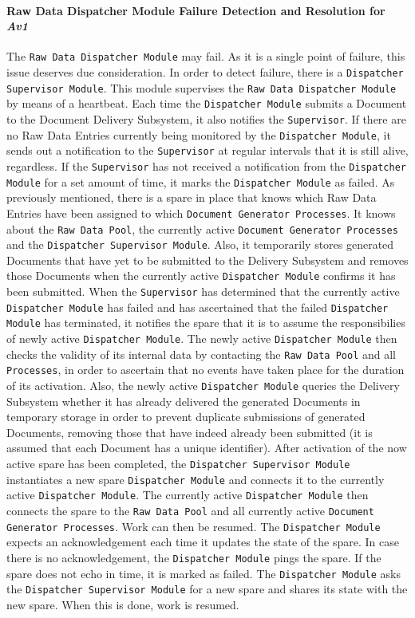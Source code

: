 \documentclass[a4paper,10pt]{article}
\begin{document}
\paragraph{Raw Data Dispatcher Module Failure Detection and Resolution for \emph{Av1}}
The \texttt{Raw Data Dispatcher Module} may fail. As it is a single point of failure, this issue deserves due consideration. In order to detect failure, there is a \texttt{Dispatcher Supervisor Module}. This module supervises the \texttt{Raw Data Dispatcher Module} by means of a heartbeat. Each time the \texttt{Dispatcher Module} submits a Document to the Document Delivery Subsystem, it also notifies the \texttt{Supervisor}. If there are no Raw Data Entries currently being monitored by the \texttt{Dispatcher Module}, it sends out a notification to the \texttt{Supervisor} at regular intervals that it is still alive, regardless. If the \texttt{Supervisor} has not received a notification from the \texttt{Dispatcher Module} for a set amount of time, it marks the \texttt{Dispatcher Module} as failed. 
As previously mentioned, there is a spare in place that knows which Raw Data Entries have been assigned to which \texttt{Document Generator Processes}. It knows about the \texttt{Raw Data Pool}, the currently active \texttt{Document Generator Processes} and the \texttt{Dispatcher Supervisor Module}. Also, it temporarily stores generated Documents that have yet to be submitted to the Delivery Subsystem and removes those Documents when the currently active \texttt{Dispatcher Module} confirms it has been submitted. When the \texttt{Supervisor} has determined that the currently active \texttt{Dispatcher Module} has failed and has ascertained that the failed \texttt{Dispatcher Module} has terminated, it notifies the spare that it is to assume the responsibilies of newly active \texttt{Dispatcher Module}. The newly active \texttt{Dispatcher Module} then checks the validity of its internal data by contacting the \texttt{Raw Data Pool} and all \texttt{Processes}, in order to ascertain that no events have taken place for the duration of its activation. Also, the newly active \texttt{Dispatcher Module} queries the Delivery Subsystem whether it has already delivered the generated Documents in temporary storage in order to prevent duplicate submissions of generated Documents, removing those that have indeed already been submitted (it is assumed that each Document has a unique identifier). After activation of the now active spare has been completed, the \texttt{Dispatcher Supervisor Module} instantiates a new spare \texttt{Dispatcher Module} and connects it to the currently active \texttt{Dispatcher Module}. The currently active \texttt{Dispatcher Module} then connects the spare to the \texttt{Raw Data Pool} and all currently active \texttt{Document Generator Processes}. Work can then be resumed.
The \texttt{Dispatcher Module} expects an acknowledgement each time it updates the state of the spare. In case there is no acknowledgement, the \texttt{Dispatcher Module} pings the spare. If the spare does not echo in time, it is marked as failed. The \texttt{Dispatcher Module} asks the \texttt{Dispatcher Supervisor Module} for a new spare and shares its state with the new spare. When this is done, work is resumed.
\end{document}
